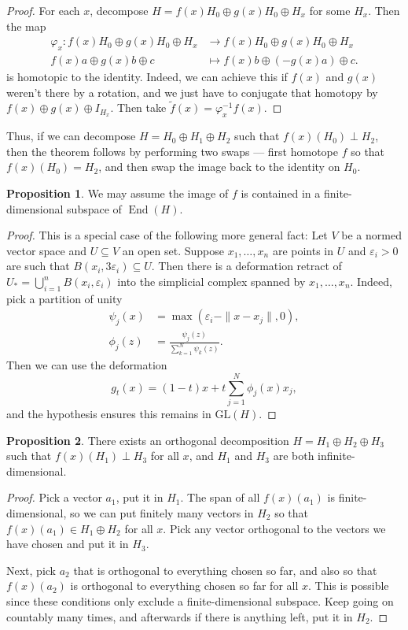 \documentclass{shortart}
\theoremstyle{definition}
\newtheorem*{prop}{Proposition}
\DeclareMathOperator{\End}{End}
\newcommand\id{I}
\newcommand\GL{\mathrm{GL}}
\begin{document}
\begin{proof}
  For each $x$, decompose $H = f(x)H_0 \oplus g(x) H_0 \oplus H_x$ for some $H_x$. Then the map
  \begin{align*}
    \varphi_x: f(x) H_0 \oplus g(x) H_0 \oplus H_x & \to f(x) H_0 \oplus g(x)H_0 \oplus H_x\\
    f(x) a \oplus g(x) b \oplus c &\mapsto f(x) b \oplus (-g(x)a) \oplus c.
  \end{align*}
  is homotopic to the identity. Indeed, we can achieve this if $f(x)$ and $g(x)$ weren't there by a rotation, and we just have to conjugate that homotopy by $f(x) \oplus g(x) \oplus \id_{H_x}$. Then take $\tilde{f}(x) = \varphi_x^{-1} f(x)$.
\end{proof}

Thus, if we can decompose $H = H_0 \oplus H_1 \oplus H_2$ such that $f(x)(H_0) \perp H_2$, then the theorem follows by performing two swaps --- first homotope $f$ so that $f(x)(H_0) = H_2$, and then swap the image back to the identity on $H_0$.

\begin{prop}
  We may assume the image of $f$ is contained in a finite-dimensional subspace of $\End(H)$.
\end{prop}
\begin{proof}
  This is a special case of the following more general fact: Let $V$ be a normed vector space and $U \subseteq V$ an open set. Suppose $x_1, \ldots, x_n$ are points in $U$ and $\varepsilon_i > 0$ are such that $B(x_i, 3 \varepsilon_i) \subseteq U$. Then there is a deformation retract of $U_* = \bigcup_{i = 1}^n B(x_i, \varepsilon_i)$ into the simplicial complex spanned by $x_1, \ldots, x_n$. Indeed, pick a partition of unity
  \begin{align*}
    \psi_j(x) &= \max(\varepsilon_i - \|x - x_j\|, 0),\\
    \phi_j(z) &= \frac{\psi_j(z)}{\sum_{k = 1}^N \psi_k(z)}.
  \end{align*}
  Then we can use the deformation
  \[
    g_t(x) = (1 - t) x + t \sum_{j = 1}^N \phi_j(x) x_j,
  \]
  and the hypothesis ensures this remains in $\GL(H)$.
\end{proof}

\begin{prop}
  There exists an orthogonal decomposition $H = H_1 \oplus H_2 \oplus H_3$ such that $f(x)(H_1) \perp H_3$ for all $x$, and $H_1$ and $H_3$ are both infinite-dimensional.
\end{prop}
\begin{proof}
  Pick a vector $a_1$, put it in $H_1$. The span of all $f(x)(a_1)$ is finite-dimensional, so we can put finitely many vectors in $H_2$ so that $f(x)(a_1) \in H_1 \oplus H_2$ for all $x$. Pick any vector orthogonal to the vectors we have chosen and put it in $H_3$.

  Next, pick $a_2$ that is orthogonal to everything chosen so far, and also so that $f(x)(a_2)$ is orthogonal to everything chosen so far for all $x$. This is possible since these conditions only exclude a finite-dimensional subspace. Keep going on countably many times, and afterwards if there is anything left, put it in $H_2$.
\end{proof}
\end{document}
